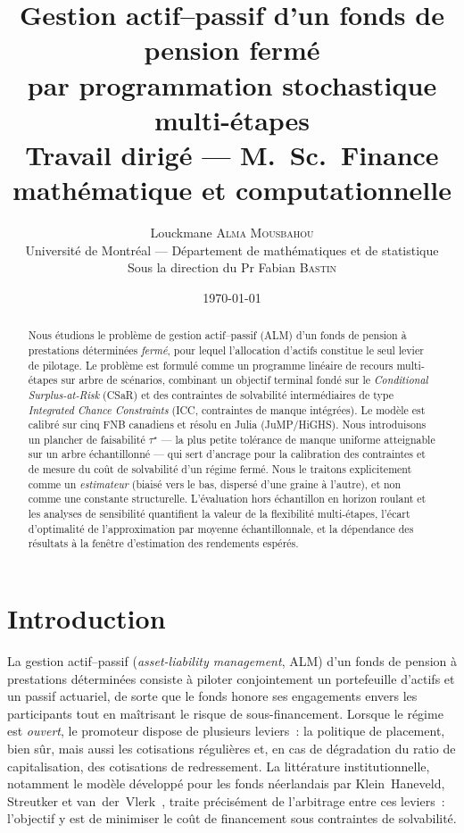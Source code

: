 \documentclass[11pt,letterpaper]{article}
\title{Gestion actif--passif d'un fonds de pension fermé\\
par programmation stochastique multi-étapes\\[0.5em]
\large Travail dirigé --- M.~Sc.\ Finance mathématique et computationnelle}
\author{Louckmane \textsc{Alma Mousbahou}\\[0.3em]
\small Université de Montréal --- Département de mathématiques et de statistique\\
\small Sous la direction du Pr Fabian \textsc{Bastin}}
\date{\today}
\newcommand{\taustar}{\tau^{\star}}
\theoremstyle{definition}
\begin{document}
\maketitle

\begin{abstract}
Nous étudions le problème de gestion actif--passif (ALM) d'un fonds de pension à
prestations déterminées \emph{fermé}, pour lequel l'allocation d'actifs constitue le
seul levier de pilotage. Le problème est formulé comme un programme linéaire de recours
multi-étapes sur arbre de scénarios, combinant un objectif terminal fondé sur le
\emph{Conditional Surplus-at-Risk} (CSaR) et des contraintes de solvabilité
intermédiaires de type \emph{Integrated Chance Constraints} (ICC, contraintes
de manque intégrées). Le modèle est
calibré sur cinq FNB canadiens et résolu en Julia (JuMP/HiGHS). Nous introduisons un
plancher de faisabilité $\taustar$ --- la plus petite tolérance de manque uniforme
atteignable sur un arbre échantillonné --- qui sert d'ancrage pour la calibration des
contraintes et de mesure du coût de solvabilité d'un régime fermé. Nous le traitons
explicitement comme un \emph{estimateur} (biaisé vers le bas, dispersé d'une graine
à l'autre), et non comme une constante structurelle. L'évaluation hors
échantillon en horizon roulant et les analyses de sensibilité quantifient la valeur de
la flexibilité multi-étapes, l'écart d'optimalité de l'approximation par moyenne
échantillonnale, et la dépendance des résultats à la fenêtre d'estimation
des rendements espérés.
\end{abstract}

\tableofcontents
\newpage

\section{Introduction}

La gestion actif--passif (\emph{asset-liability management}, ALM) d'un fonds de
pension à prestations déterminées consiste à piloter conjointement un portefeuille
d'actifs et un passif actuariel, de sorte que le fonds honore ses engagements envers
les participants tout en maîtrisant le risque de sous-financement. Lorsque le régime
est \emph{ouvert}, le promoteur dispose de plusieurs leviers~: la politique de
placement, bien sûr, mais aussi les cotisations régulières et, en cas de dégradation
du ratio de capitalisation, des cotisations de redressement. La littérature
institutionnelle, notamment le modèle développé pour les fonds néerlandais par
Klein~Haneveld, Streutker et van~der~Vlerk~\cite{KHSV2010}, traite précisément de
l'arbitrage entre ces leviers~: l'objectif y est de minimiser le coût de financement
sous contraintes de solvabilité.
\end{document}

